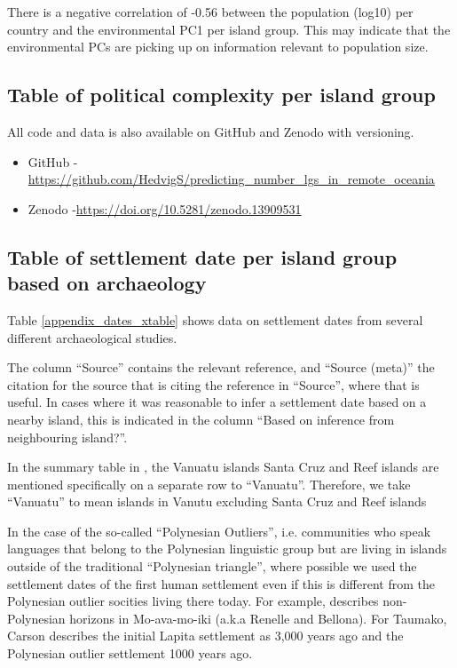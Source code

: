 \documentclass[unnumsec,webpdf,modern,medium]{oup-authoring-template}
\begin{document}
There is a negative correlation of -0.56 between the population (log10) per country and the environmental PC1 per island group. This may indicate that the environmental PCs are picking up on information relevant to population size.

\FloatBarrier
\newpage

\subsection{Table of political complexity per island group }
\singlespacing
All code and data is also available on GitHub and Zenodo with versioning.

\begin{itemize}
    \item GitHub - \url{https://github.com/HedvigS/predicting_number_lgs_in_remote_oceania}
    \item Zenodo -\url{https://doi.org/10.5281/zenodo.13909531}
\end{itemize}

 \begin{landscape}
     
\label{appendix_pol_complex}


 \end{landscape}

\newpage

\subsection{Table of settlement date per island group based on archaeology}
\singlespacing
\label{appendix_dates_table_appendix}
Table \ref{appendix_dates_xtable} shows data on settlement dates from several different archaeological studies. 

The column ``Source'' contains the relevant reference, and ``Source (meta)'' the citation for the source that is citing the reference in ``Source'', where that is useful. In cases where it was reasonable to infer a settlement date based on a nearby island, this is indicated in the column ``Based on inference from neighbouring island?''.

In the summary table in \citet{rieth_cochrane_2018},  the Vanuatu islands Santa Cruz and Reef islands are mentioned specifically on a separate row to ``Vanuatu''. Therefore, we take ``Vanuatu'' to mean islands in Vanutu excluding Santa Cruz and Reef islands 

In the case of the so-called ``Polynesian Outliers'', i.e. communities who speak languages that belong to the Polynesian linguistic group but are living in islands outside of the traditional ``Polynesian triangle'', where possible we used the settlement dates of the first human settlement even if this is different from the Polynesian outlier socities living there today. For example, \citet{carson2012recent} describes non-Polynesian horizons in Mo-ava-mo-iki (a.k.a Renelle and Bellona). For Taumako, Carson describes the initial Lapita settlement as 3,000 years ago and the Polynesian outlier settlement 1000 years ago.
\end{document}
